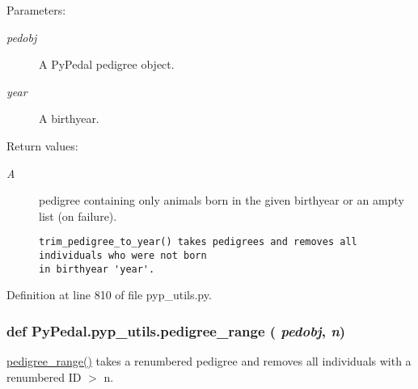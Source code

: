 \begin{Desc}
\item[Parameters:]
\begin{description}
\item[{\em pedobj}]A Py\-Pedal pedigree object. \item[{\em year}]A birthyear. \end{description}
\end{Desc}
\begin{Desc}
\item[Return values:]
\begin{description}
\item[{\em A}]pedigree containing only animals born in the given birthyear or an ampty list (on failure).

\footnotesize\begin{verbatim}trim_pedigree_to_year() takes pedigrees and removes all individuals who were not born
in birthyear 'year'.
\end{verbatim}
\normalsize
 \end{description}
\end{Desc}


Definition at line 810 of file pyp\_\-utils.py.\hypertarget{namespacePyPedal_1_1pyp__utils_f58fb7e6b3ffa8cd5c7f1b78d9399477}{
\subsubsection[pedigree\_\-range]{\setlength{\rightskip}{0pt plus 5cm}def Py\-Pedal.pyp\_\-utils.pedigree\_\-range ( {\em pedobj},  {\em n})}}
\label{namespacePyPedal_1_1pyp__utils_f58fb7e6b3ffa8cd5c7f1b78d9399477}


\hyperlink{namespacePyPedal_1_1pyp__utils_f58fb7e6b3ffa8cd5c7f1b78d9399477}{pedigree\_\-range()} takes a renumbered pedigree and removes all individuals with a renumbered ID $>$ n. 

